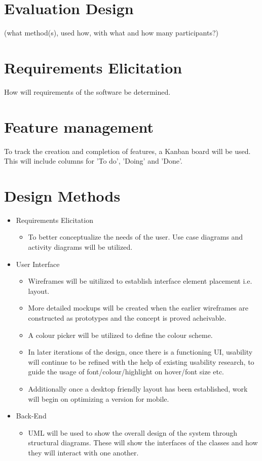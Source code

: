 \section{Evaluation Design}
 (what method(s), used how, with what and how many participants?)

\section{Requirements Elicitation}
  How will requirements of the software be determined.

\section{Feature management}
  To track the creation and completion of features, a Kanban board will be used. This will include columns for 'To do', 'Doing' and 'Done'.

\section{Design Methods}
   \begin{itemize}
     \item Requirements Elicitation
     \begin{itemize}
       \item To better conceptualize the needs of the user. Use case diagrams and activity diagrams will be utilized.
     \end{itemize}
     \item User Interface
     \begin{itemize}
       \item Wireframes will be uitilized to establish interface element placement i.e. layout.
       \item More detailed mockups will be created when the earlier wireframes are constructed as prototypes and the concept is proved acheivable.
       \item A colour picker will be utilized to define the colour scheme.
       \item In later iterations of the design, once there is a functioning UI, usability will continue to be refined with the help of existing usability research, to guide the usage of font/colour/highlight on hover/font size etc.
       \item Additionally once a desktop friendly layout has been established, work will begin on optimizing a version for mobile.
     \end{itemize}
     \item Back-End
     \begin{itemize}
       \item UML will be used to show the overall design of the system through structural diagrams. These will show the interfaces of the classes and how they will interact with one another.
     \end{itemize}
   \end{itemize}

